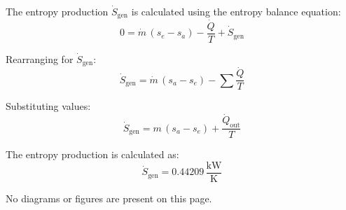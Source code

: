 The entropy production \( \dot{S}_{\text{gen}} \) is calculated using the entropy balance equation:  
\[
0 = \dot{m} \, (s_e - s_a) - \frac{\dot{Q}}{T} + \dot{S}_{\text{gen}}
\]  

Rearranging for \( \dot{S}_{\text{gen}} \):  
\[
\dot{S}_{\text{gen}} = \dot{m} \, (s_a - s_e) - \sum \frac{\dot{Q}}{T}
\]  

Substituting values:  
\[
\dot{S}_{\text{gen}} = m \, (s_a - s_e) + \frac{\dot{Q}_{\text{out}}}{T}
\]  

The entropy production is calculated as:  
\[
\dot{S}_{\text{gen}} = 0.44209 \, \frac{\text{kW}}{\text{K}}
\]  

No diagrams or figures are present on this page.